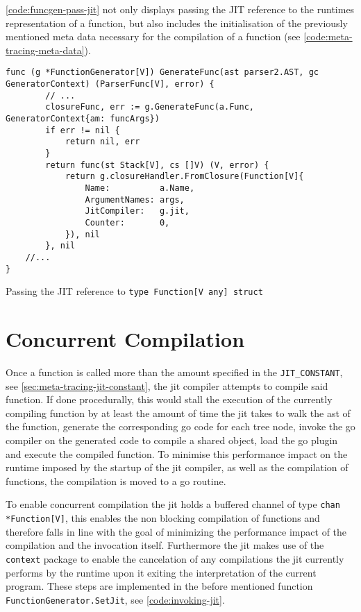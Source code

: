 \autoref{code:funcgen-pass-jit} not only displays passing the JIT reference
to the runtimes representation of a function, but also includes the
initialisation of the previously mentioned meta data necessary for the
compilation of a function (see \autoref{code:meta-tracing-meta-data}).

\begin{listing}[H]
    \begin{verbatim}
func (g *FunctionGenerator[V]) GenerateFunc(ast parser2.AST, gc GeneratorContext) (ParserFunc[V], error) {
        // ...
        closureFunc, err := g.GenerateFunc(a.Func, GeneratorContext{am: funcArgs})
        if err != nil {
            return nil, err
        }
        return func(st Stack[V], cs []V) (V, error) {
            return g.closureHandler.FromClosure(Function[V]{
                Name:          a.Name,
                ArgumentNames: args,
                JitCompiler:   g.jit,
                Counter:       0,
            }), nil
        }, nil
    //...
}
    \end{verbatim}
    \caption{Passing the JIT reference to \texttt{type Function[V any] struct}}
    \label{code:funcgen-pass-jit}
\end{listing}

\section{Concurrent Compilation}
\label{sec:concurrent-compilation}

Once a function is called more than the amount specified in the
\texttt{JIT\_CONSTANT}, see \autoref{sec:meta-tracing-jit-constant}, the jit
compiler attempts to compile said function. If done procedurally, this would
stall the execution of the currently compiling function by at least the amount
of time the jit takes to walk the ast of the function, generate the
corresponding go code for each tree node, invoke the go compiler on the
generated code to compile a shared object, load the go plugin and execute the
compiled function. To minimise this performance impact on the runtime imposed
by the startup of the jit compiler, as well as the compilation of functions,
the compilation is moved to a go routine.

To enable concurrent compilation the jit holds a buffered channel of type
\texttt{chan *Function[V]}, this enables the non blocking compilation
of functions and therefore falls in line with the goal of minimizing the
performance impact of the compilation and the invocation itself. Furthermore
the jit makes use of the \texttt{context} package to enable the cancelation of
any compilations the jit currently performs by the runtime upon it exiting the
interpretation of the current program. These steps are implemented in the
before mentioned function \texttt{FunctionGenerator.SetJit}, see
\autoref{code:invoking-jit}. 

